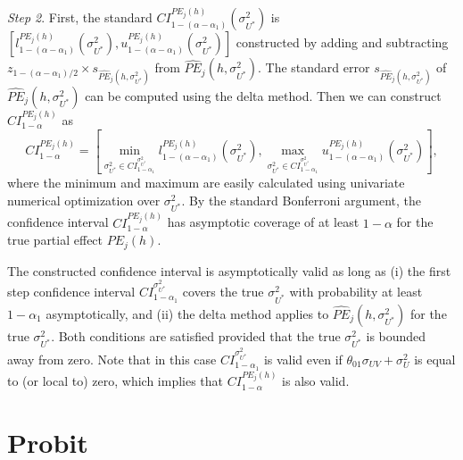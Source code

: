 \documentclass[12pt]{article}
\begin{document}
\noindent \textit{Step 2}. First, the standard $CI_{1-\left( \alpha -\alpha
_{1}\right) }^{PE_{j}(h)}\left( \sigma _{U^{\ast }}^{2}\right) $ is $\left[
l_{1-\left( \alpha -\alpha _{1}\right) }^{PE_{j}(h)}\left( \sigma _{U^{\ast
}}^{2}\right) ,u_{1-\left( \alpha -\alpha _{1}\right) }^{PE_{j}(h)}\left(
\sigma _{U^{\ast }}^{2}\right) \right]$ constructed by adding and
subtracting $z_{1-(\alpha -\alpha _{1})/2}\times s_{\widehat{PE}%
_{j}(h,\sigma _{U^{\ast }}^{2})}$ from $\widehat{PE}_{j}(h,\sigma _{U^{\ast
}}^{2})$. The standard error $s_{\widehat{PE}_{j}(h,\sigma _{U^{\ast
}}^{2})} $ of $\widehat{PE}_{j}(h,\sigma _{U^{\ast }}^{2})$ can be computed
using the delta method. Then we can construct $CI_{1-\alpha }^{PE_{j}(h)}$
as 
\begin{equation*}
CI_{1-\alpha }^{PE_{j}(h)} = \left[\min_{\sigma _{U^{\ast }}^{2}\in
CI_{1-\alpha _{1}}^{\sigma _{U^{\ast }}^{2}}}l_{1-\left( \alpha -\alpha
_{1}\right) }^{PE_{j}(h)}\left( \sigma _{U^{\ast }}^{2}\right) ,
\max_{\sigma _{U^{\ast }}^{2}\in CI_{1-\alpha _{1}}^{\sigma _{U^{\ast
}}^{2}}}u_{1-\left( \alpha -\alpha _{1}\right) }^{PE_{j}(h)}\left( \sigma
_{U^{\ast }}^{2}\right)\right] ,
\end{equation*}%
where the minimum and maximum are easily calculated using univariate
numerical optimization over $\sigma _{U^{\ast }}^{2}$. By the standard
Bonferroni argument, the confidence interval $CI_{1-\alpha }^{PE_{j}(h)}$
has asymptotic coverage of at least $1-\alpha $ for the true partial effect $%
PE_{j}(h)$.

\smallskip

The constructed confidence interval is asymptotically valid as long as (i)
the first step confidence interval $CI_{1-\alpha _{1}}^{\sigma _{U^{\ast
}}^{2}}$ covers the true $\sigma _{U^{\ast }}^{2}$ with probability at least 
$1-\alpha _{1}$ asymptotically, and (ii) the delta method applies to $%
\widehat{PE}_{j}(h,\sigma _{U^{\ast }}^{2})$ for the true $\sigma _{U^{\ast
}}^{2}$. Both conditions are satisfied provided that the true $\sigma
_{U^{\ast }}^{2}$ is bounded away from zero. Note that in this case $%
CI_{1-\alpha _{1}}^{\sigma _{U^{\ast }}^{2}}$ is valid even if $\theta
_{01}\sigma _{UV}+\sigma _{U}^{2}$ is equal to (or local to) zero, which
implies that $CI_{1-\alpha }^{PE_{j}(h)}$ is also valid.

\bigskip

\section{Probit}\label{sec:Probit}
\end{document}
